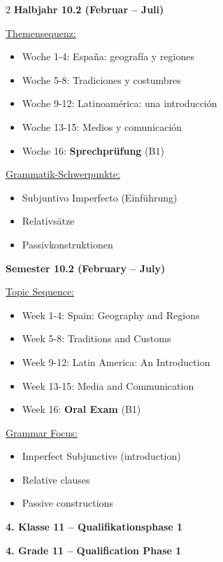 \documentclass[10pt,a4paper]{article}
\newcommand{\bil}[2]{%
\begin{paracol}{2}
\small #1
\switchcolumn
\small\textcolor{english}{#2}
\end{paracol}
}
\newcommand{\secbil}[2]{%
\vspace{8pt}
\noindent\colorbox{spanisch}{\parbox{0.48\textwidth}{\color{white}\bfseries #1}}%
\hfill%
\colorbox{english}{\parbox{0.48\textwidth}{\color{white}\bfseries #2}}
\vspace{4pt}
}
\begin{document}
\bil{%
\textbf{Halbjahr 10.2 (Februar -- Juli)}

\underline{Themensequenz:}
\begin{itemize}[noitemsep,topsep=2pt]
\item Woche 1-4: España: geografía y regiones
\item Woche 5-8: Tradiciones y costumbres
\item Woche 9-12: Latinoamérica: una introducción
\item Woche 13-15: Medios y comunicación
\item Woche 16: \textbf{Sprechprüfung} (B1)
\end{itemize}

\underline{Grammatik-Schwerpunkte:}
\begin{itemize}[noitemsep,topsep=2pt]
\item Subjuntivo Imperfecto (Einführung)
\item Relativsätze
\item Passivkonstruktionen
\end{itemize}
}{%
\textbf{Semester 10.2 (February -- July)}

\underline{Topic Sequence:}
\begin{itemize}[noitemsep,topsep=2pt]
\item Week 1-4: Spain: Geography and Regions
\item Week 5-8: Traditions and Customs
\item Week 9-12: Latin America: An Introduction
\item Week 13-15: Media and Communication
\item Week 16: \textbf{Oral Exam} (B1)
\end{itemize}

\underline{Grammar Focus:}
\begin{itemize}[noitemsep,topsep=2pt]
\item Imperfect Subjunctive (introduction)
\item Relative clauses
\item Passive constructions
\end{itemize}
}

\newpage

\secbil{4. Klasse 11 -- Qualifikationsphase 1}{4. Grade 11 -- Qualification Phase 1}
\end{document}

